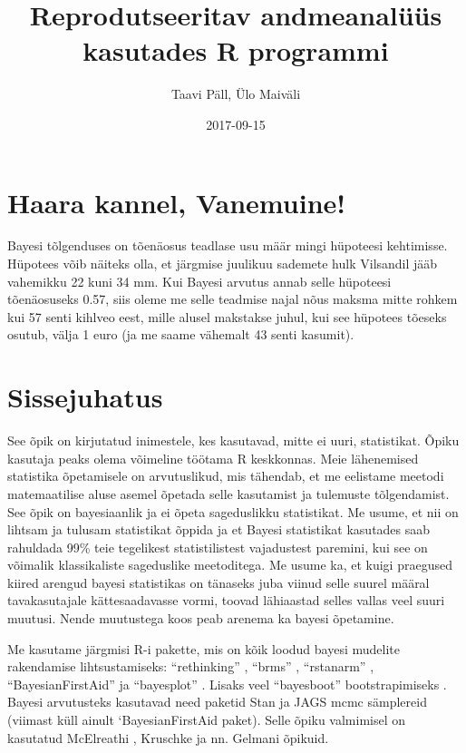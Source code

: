 \documentclass[]{book}
\title{Reprodutseeritav andmeanalüüs kasutades R programmi}
\author{Taavi Päll, Ülo Maiväli}
\date{2017-09-15}
\begin{document}
\maketitle

{
\setcounter{tocdepth}{1}
\tableofcontents
}
\chapter{Haara kannel, Vanemuine!}\label{haara-kannel-vanemuine}

Bayesi tõlgenduses on tõenäosus teadlase usu määr mingi hüpoteesi
kehtimisse. Hüpotees võib näiteks olla, et järgmise juulikuu sademete
hulk Vilsandil jääb vahemikku 22 kuni 34 mm. Kui Bayesi arvutus annab
selle hüpoteesi tõenäosuseks 0.57, siis oleme me selle teadmise najal
nõus maksma mitte rohkem kui 57 senti kihlveo eest, mille alusel
makstakse juhul, kui see hüpotees tõeseks osutub, välja 1 euro (ja me
saame vähemalt 43 senti kasumit).

\chapter{Sissejuhatus}\label{intro}

See õpik on kirjutatud inimestele, kes kasutavad, mitte ei uuri,
statistikat. Õpiku kasutaja peaks olema võimeline töötama R keskkonnas.
Meie lähenemised statistika õpetamisele on arvutuslikud, mis tähendab,
et me eelistame meetodi matemaatilise aluse asemel õpetada selle
kasutamist ja tulemuste tõlgendamist. See õpik on bayesiaanlik ja ei
õpeta sageduslikku statistikat. Me usume, et nii on lihtsam ja tulusam
statistikat õppida ja et Bayesi statistikat kasutades saab rahuldada
99\% teie tegelikest statistilistest vajadustest paremini, kui see on
võimalik klassikaliste sageduslike meetoditega. Me usume ka, et kuigi
praegused kiired arengud bayesi statistikas on tänaseks juba viinud
selle suurel määral tavakasutajale kättesaadavasse vormi, toovad
lähiaastad selles vallas veel suuri muutusi. Nende muutustega koos peab
arenema ka bayesi õpetamine.

Me kasutame järgmisi R-i pakette, mis on kõik loodud bayesi mudelite
rakendamise lihtsustamiseks: ``rethinking'' \citep{rethinking}, ``brms''
\citep{brms}, ``rstanarm'' \citep{rstanarm}, ``BayesianFirstAid''
\citep{bayesianfirstaid} ja ``bayesplot'' \citep{bayesplot}. Lisaks veel
``bayesboot'' bootstrapimiseks \citep{bayesboot}. Bayesi arvutusteks
kasutavad need paketid Stan ja JAGS mcmc sämplereid (viimast küll ainult
`BayesianFirstAid paket). Selle õpiku valmimisel on kasutatud McElreathi
\citep{mcelreath2015}, Kruschke \citep{kruschke2014} ja nn. Gelmani
\citep{gelman2014} õpikuid.
\end{document}
